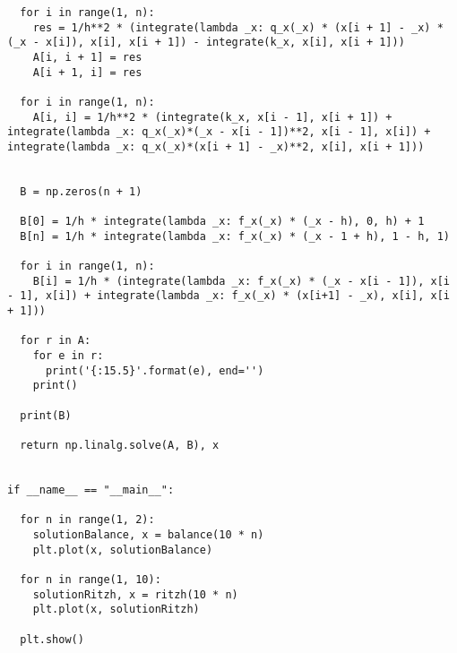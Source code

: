 \documentclass[12pt]{article}
\begin{document}
\begin{verbatim}
  for i in range(1, n):
    res = 1/h**2 * (integrate(lambda _x: q_x(_x) * (x[i + 1] - _x) * (_x - x[i]), x[i], x[i + 1]) - integrate(k_x, x[i], x[i + 1]))
    A[i, i + 1] = res
    A[i + 1, i] = res

  for i in range(1, n):
    A[i, i] = 1/h**2 * (integrate(k_x, x[i - 1], x[i + 1]) + integrate(lambda _x: q_x(_x)*(_x - x[i - 1])**2, x[i - 1], x[i]) + integrate(lambda _x: q_x(_x)*(x[i + 1] - _x)**2, x[i], x[i + 1]))


  B = np.zeros(n + 1)

  B[0] = 1/h * integrate(lambda _x: f_x(_x) * (_x - h), 0, h) + 1
  B[n] = 1/h * integrate(lambda _x: f_x(_x) * (_x - 1 + h), 1 - h, 1)

  for i in range(1, n):
    B[i] = 1/h * (integrate(lambda _x: f_x(_x) * (_x - x[i - 1]), x[i - 1], x[i]) + integrate(lambda _x: f_x(_x) * (x[i+1] - _x), x[i], x[i + 1]))

  for r in A:
    for e in r:
      print('{:15.5}'.format(e), end='')
    print()

  print(B)

  return np.linalg.solve(A, B), x


if __name__ == "__main__":

  for n in range(1, 2):
    solutionBalance, x = balance(10 * n)
    plt.plot(x, solutionBalance)

  for n in range(1, 10):
    solutionRitzh, x = ritzh(10 * n)
    plt.plot(x, solutionRitzh)

  plt.show()
\end{verbatim}
\end{document}

